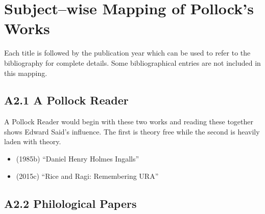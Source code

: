 
\chapter{Subject–wise Mapping of Pollock’s Works}\label{chapter7}

Each title is followed by the publication year which can be used to refer to the bibliography for complete details. Some bibliographical entries are not included in this mapping.

\section*{A2.1 A Pollock Reader}

A Pollock Reader would begin with these two works and reading these together shows Edward Said’s influence. The first is theory free while the second is heavily laden with theory.

\begin{itemize}
\item (1985b) “Daniel Henry Holmes Ingalls”

 \item (2015c) “Rice and Ragi: Remembering URA”

\end{itemize}


\section*{A2.2 Philological Papers}

